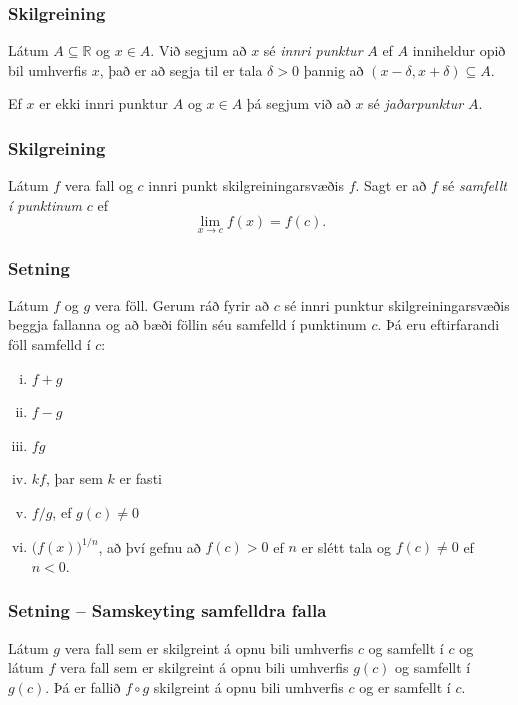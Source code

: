 \documentclass[icelandic,a4paper,12pt]{article}
\newcommand{\R}{{\mathbb  R}}
\begin{document}
\subsubsection{Skilgreining}
Látum $A\subseteq \R$ og $x\in A$.  Við segjum að $x$ sé \emph{innri
punktur} $A$ ef $A$ inniheldur opið bil umhverfis $x$, það er að
segja til er tala $\delta>0$ þannig að $(x-\delta, x+\delta)\subseteq
A$. 

\pause

Ef $x$ er ekki innri punktur $A$ og $x\in A$ þá segjum við að $x$ sé
\emph{jaðarpunktur} $A$.

\pause

\subsubsection{Skilgreining}
Látum $f$ vera fall og $c$ innri punkt skilgreiningarsvæðis $f$.  Sagt
er að $f$ sé \emph{samfellt í punktinum} $c$ ef
$$\lim_{x\rightarrow c}f(x)=f(c).$$

\subsubsection{Setning}
Látum $f$ og $g$ vera föll.  Gerum ráð fyrir að $c$ sé innri punktur
skilgreiningarsvæðis beggja fallanna og að bæði föllin séu samfelld í
punktinum $c$.  Þá eru eftirfarandi föll samfelld í $c$:
\begin{enumerate}[(i)] 
\pause
\item $f+g$ %
\pause
\item $f-g$
\pause
\item $fg$
\pause
\item $kf$, þar sem $k$ er fasti
\pause
\item $f/g$, ef $g(c)\neq 0$
\pause
\item $\Big(f(x)\Big)^{1/n}$, að því gefnu að 
$f(c)>0$ ef $n$ er slétt tala og $f(c)\neq 0$ ef $n<0$.
\end{enumerate} 

\subsubsection{Setning -- Samskeyting samfelldra falla}
Látum $g$ vera fall sem er skilgreint á opnu bili umhverfis $c$ og
samfellt í $c$ og látum $f$ vera fall sem er skilgreint á opnu bili
umhverfis $g(c)$ og samfellt í $g(c)$.  Þá er fallið $f\circ g$
skilgreint á opnu bili umhverfis $c$ og er samfellt í $c$.  
% 
 
\end{document}
